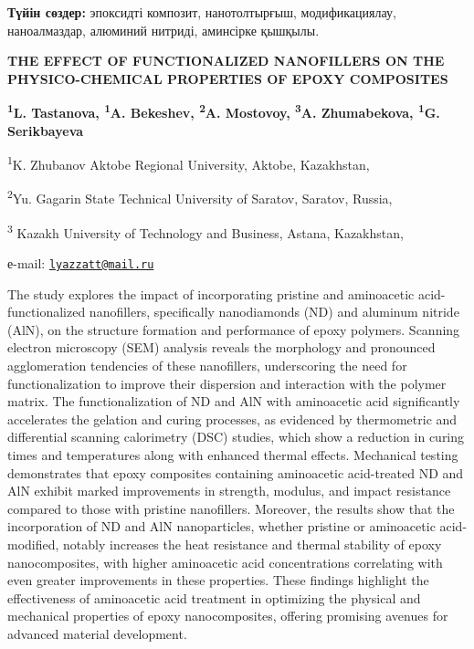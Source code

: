 {\bfseries Түйін сөздер:} эпоксидті композит, нанотолтырғыш,
модификациялау, наноалмаздар, алюминий нитриді, аминсірке қышқылы.

\begin{articleheader}
{\bfseries THE EFFECT OF FUNCTIONALIZED NANOFILLERS ON THE PHYSICO-CHEMICAL
PROPERTIES OF EPOXY COMPOSITES}

{\bfseries \textsuperscript{1}L. Tastanova\textsuperscript{\envelope },
\textsuperscript{1}A. Bekeshev, \textsuperscript{2}A. Mostovoy,
\textsuperscript{3}A. Zhumabekova, \textsuperscript{1}G. Serikbayeva}
\end{articleheader}

\begin{affiliation}
\textsuperscript{1}K. Zhubanov Aktobe Regional University, Aktobe,
Kazakhstan,

\textsuperscript{2}Yu. Gagarin State Technical University of Saratov,
Saratov, Russia,

\textsuperscript{3} Kazakh University of Technology and Business,
Astana, Kazakhstan,

е-mail: \href{mailto:lyazzatt@mail.ru}{\nolinkurl{lyazzatt@mail.ru}}
\end{affiliation}

The study explores the impact of incorporating pristine and aminoacetic
acid-functionalized nanofillers, specifically nanodiamonds (ND) and
aluminum nitride (AlN), on the structure formation and performance of
epoxy polymers. Scanning electron microscopy (SEM) analysis reveals the
morphology and pronounced agglomeration tendencies of these nanofillers,
underscoring the need for functionalization to improve their dispersion
and interaction with the polymer matrix. The functionalization of ND and
AlN with aminoacetic acid significantly accelerates the gelation and
curing processes, as evidenced by thermometric and differential scanning
calorimetry (DSC) studies, which show a reduction in curing times and
temperatures along with enhanced thermal effects. Mechanical testing
demonstrates that epoxy composites containing aminoacetic acid-treated
ND and AlN exhibit marked improvements in strength, modulus, and impact
resistance compared to those with pristine nanofillers. Moreover, the
results show that the incorporation of ND and AlN nanoparticles, whether
pristine or aminoacetic acid-modified, notably increases the heat
resistance and thermal stability of epoxy nanocomposites, with higher
aminoacetic acid concentrations correlating with even greater
improvements in these properties. These findings highlight the
effectiveness of aminoacetic acid treatment in optimizing the physical
and mechanical properties of epoxy nanocomposites, offering promising
avenues for advanced material development.

